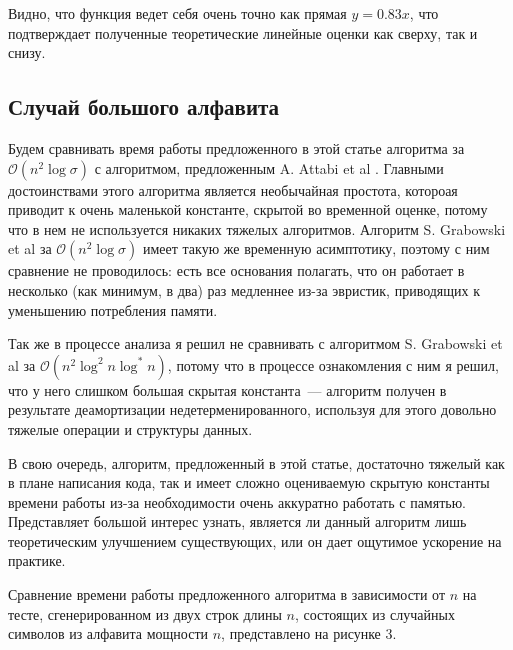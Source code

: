 Видно, что функция ведет себя очень точно как прямая $y=0.83x$, что подтверждает полученные теоретические линейные оценки как сверху, так и снизу.


\subsection{Случай большого алфавита}

Будем сравнивать время работы предложенного в этой статье алгоритма за $\mathcal{O}(n^2 \log \sigma)$ с алгоритмом, предложенным A. Attabi et al \cite{1}. Главными достоинствами этого алгоритма является необычайная простота, котороая приводит к очень маленькой константе, скрытой во временной оценке, потому что в нем не используется никаких тяжелых алгоритмов. Алгоритм S. Grabowski et al \cite{4} за $\mathcal{O}
(n^2 \log \sigma)$ имеет такую же временную асимптотику, поэтому с ним сравнение не проводилось: есть все основания полагать, что он работает в несколько (как минимум, в два) раз медленнее из-за эвристик, приводящих к уменьшению потребления памяти.

Так же в процессе анализа я решил не сравнивать с алгоритмом S. Grabowski et al \cite{4} за $\mathcal{O}(n^2 \log^2 n \log^* n)$, потому что в процессе ознакомления с ним я решил, что у него слишком большая скрытая константа~--- алгоритм получен в результате деамортизации недетерменированного, используя для этого довольно тяжелые операции и структуры данных.

В свою очередь, алгоритм, предложенный в этой статье, достаточно тяжелый как в плане написания кода, так и имеет сложно оцениваемую скрытую константы времени работы из-за необходимости очень аккуратно работать с памятью. Представляет большой интерес узнать, является ли данный алгоритм лишь теоретическим улучшением существующих, или он дает ощутимое ускорение на практике.

Сравнение времени работы предложенного алгоритма в зависимости от $n$ на тесте, сгенерированном из двух строк длины $n$, состоящих из случайных символов из алфавита мощности $n$, представлено на рисунке 3.

